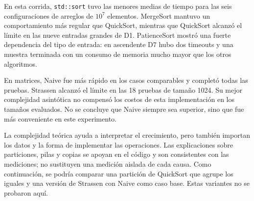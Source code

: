 En esta corrida, \texttt{std::sort} tuvo las menores medias de tiempo para
las seis configuraciones de arreglos de $10^7$ elementos. MergeSort mantuvo
un comportamiento más regular que QuickSort, mientras que QuickSort alcanzó
el límite en las nueve entradas grandes de D1. PatienceSort mostró una fuerte
dependencia del tipo de entrada: en ascendente D7 hubo dos timeouts y una
muestra terminada con un consumo de memoria mucho mayor que los otros algoritmos.

En matrices, Naive fue más rápido en los casos comparables y completó todas
las pruebas. Strassen alcanzó el límite en las 18 pruebas de tamaño 1024.
Su mejor complejidad asintótica no compensó los costos de esta implementación
en los tamaños evaluados. No se concluye que Naive siempre sea superior,
sino que fue más conveniente en este experimento.

La complejidad teórica ayuda a interpretar el crecimiento, pero también importan
los datos y la forma de implementar las operaciones. Las explicaciones sobre
particiones, pilas y copias se apoyan en el código y son consistentes con las
mediciones; no sustituyen una medición aislada de cada causa. Como continuación,
se podría comparar una partición de QuickSort que agrupe los iguales y una
versión de Strassen con Naive como caso base. Estas variantes no se probaron aquí.

\clearpage

